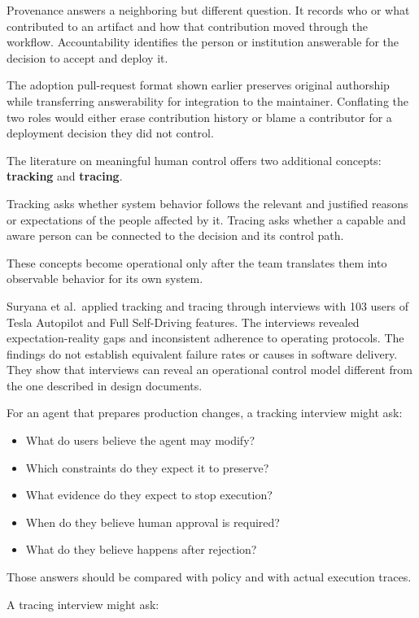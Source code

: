 Provenance answers a neighboring but different question. It records who or what contributed to an artifact and how that contribution moved through the workflow. Accountability identifies the person or institution answerable for the decision to accept and deploy it.

The adoption pull-request format shown earlier preserves original authorship while transferring answerability for integration to the maintainer. Conflating the two roles would either erase contribution history or blame a contributor for a deployment decision they did not control.

The literature on meaningful human control offers two additional concepts: \textbf{tracking} and \textbf{tracing}.

Tracking asks whether system behavior follows the relevant and justified reasons or expectations of the people affected by it. Tracing asks whether a capable and aware person can be connected to the decision and its control path.

These concepts become operational only after the team translates them into observable behavior for its own system.

Suryana et al.~applied tracking and tracing through interviews with 103 users of Tesla Autopilot and Full Self-Driving features. The interviews revealed expectation-reality gaps and inconsistent adherence to operating protocols. The findings do not establish equivalent failure rates or causes in software delivery. They show that interviews can reveal an operational control model different from the one described in design documents.

For an agent that prepares production changes, a tracking interview might ask:

\begin{itemize}
\tightlist
\item
  What do users believe the agent may modify?
\item
  Which constraints do they expect it to preserve?
\item
  What evidence do they expect to stop execution?
\item
  When do they believe human approval is required?
\item
  What do they believe happens after rejection?
\end{itemize}

Those answers should be compared with policy and with actual execution traces.

A tracing interview might ask:

